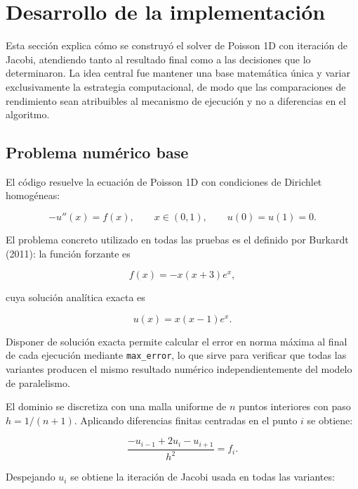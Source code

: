 \section{Desarrollo de la implementación}

Esta sección explica cómo se construyó el solver de Poisson 1D con iteración de Jacobi, atendiendo tanto al resultado final como a las decisiones que lo determinaron. La idea central fue mantener una base matemática única y variar exclusivamente la estrategia computacional, de modo que las comparaciones de rendimiento sean atribuibles al mecanismo de ejecución y no a diferencias en el algoritmo.

\subsection{Problema numérico base}

El código resuelve la ecuación de Poisson 1D con condiciones de Dirichlet homogéneas:

\begin{equation}
    -u''(x) = f(x), \qquad x \in (0,1), \qquad u(0)=u(1)=0.
\end{equation}

El problema concreto utilizado en todas las pruebas es el definido por Burkardt (2011): la función forzante es

\begin{equation}
    f(x) = -x(x+3)e^x,
\end{equation}

cuya solución analítica exacta es

\begin{equation}
    u(x) = x(x-1)e^x.
\end{equation}

Disponer de solución exacta permite calcular el error en norma máxima al final de cada ejecución mediante \texttt{max\_error}, lo que sirve para verificar que todas las variantes producen el mismo resultado numérico independientemente del modelo de paralelismo.

El dominio se discretiza con una malla uniforme de $n$ puntos interiores con paso $h = 1/(n+1)$. Aplicando diferencias finitas centradas en el punto $i$ se obtiene:

\begin{equation}
    \frac{-u_{i-1} + 2u_i - u_{i+1}}{h^2} = f_i.
\end{equation}

Despejando $u_i$ se obtiene la iteración de Jacobi usada en todas las variantes:


